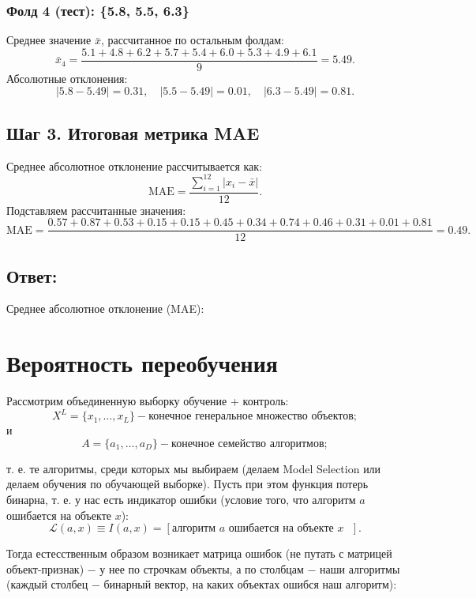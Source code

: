 \subsubsection*{Фолд 4 (тест): \{5.8, 5.5, 6.3\}}
Среднее значение \(\bar{x}\), рассчитанное по остальным фолдам:
\[
\bar{x}_4 = \frac{5.1 + 4.8 + 6.2 + 5.7 + 5.4 + 6.0 + 5.3 + 4.9 + 6.1}{9} = 5.49.
\]
Абсолютные отклонения:
\[
|5.8 - 5.49| = 0.31, \quad |5.5 - 5.49| = 0.01, \quad |6.3 - 5.49| = 0.81.
\]

\subsection*{Шаг 3. Итоговая метрика MAE}
Среднее абсолютное отклонение рассчитывается как:
\[
\text{MAE} = \frac{\sum_{i=1}^{12} |x_i - \bar{x}|}{12}.
\]
Подставляем рассчитанные значения:
\[
\text{MAE} = \frac{0.57 + 0.87 + 0.53 + 0.15 + 0.15 + 0.45 + 0.34 + 0.74 + 0.46 + 0.31 + 0.01 + 0.81}{12} = 0.49.
\]

\subsection*{Ответ:}
Среднее абсолютное отклонение (MAE): 


\section{Вероятность переобучения}

Рассмотрим объединенную выборку обучение + контроль:
\begin{equation*}
    X^L=\{ x_1, \dots , x_L \} - \text{конечное} \textit{ генеральное множество } \text{объектов};
\end{equation*}
и
\begin{equation*}
    A=\{ a_1, \dots , a_D \} - \text{конечное} \textit{ семейство алгоритмов};
\end{equation*}

т. е. те алгоритмы, среди которых мы выбираем (делаем Model \newline Selection или делаем обучения по обучающей выборке). Пусть при этом функция потерь бинарна, т. е. у нас есть индикатор ошибки (условие того, что алгоритм $a$ ошибается на объекте $x$):
\begin{equation*}
    \mathcal{L} ( a, x ) \equiv I ( a, x ) = [ \text{алгоритм $a$ ошибается на объекте $x$ } ].
\end{equation*}

Тогда естесственным образом возникает матрица ошибок (не путать с матрицей объект-признак) $-$ у нее по строчкам объекты, а по столбцам $-$ наши алгоритмы (каждый столбец $-$ бинарный вектор, на каких объектах ошибся наш алгоритм):

